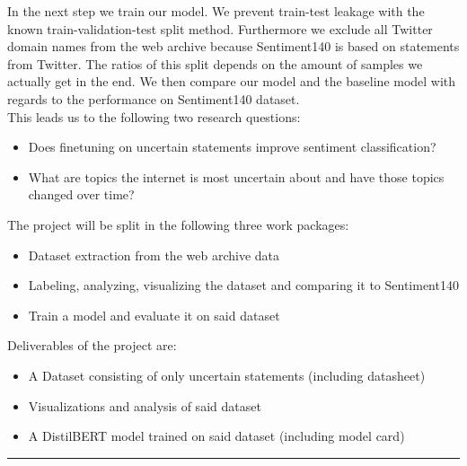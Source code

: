 \documentclass[a4paper,12pt,numbers=enddot]{scrartcl}
\begin{document}
In the next step we train our model. We prevent train-test leakage with the known train-validation-test split method. Furthermore we exclude all Twitter domain names from the web archive because Sentiment140 is based on statements from Twitter. The ratios of this split depends on the amount of samples we actually get in the end. We then compare our model and the baseline model with regards to the performance on Sentiment140 dataset.
\\

This leads us to the following two research questions:
\begin{itemize}
	\setlength\itemsep{-5pt}
	\item Does finetuning on uncertain statements improve sentiment classification?
	\item What are topics the internet is most uncertain about and have those topics changed over time?
\end{itemize}

The project will be split in the following three work packages:
\begin{itemize}
	\setlength\itemsep{-5pt}
	\item Dataset extraction from the web archive data
	\item Labeling, analyzing, visualizing the dataset and comparing it to Sentiment140
	\item Train a model and evaluate it on said dataset
\end{itemize}

Deliverables of the project are:
\begin{itemize}
	\setlength\itemsep{-5pt}
	\item A Dataset consisting of only uncertain statements (including datasheet)
	\item Visualizations and analysis of said dataset
	\item A DistilBERT model trained on said dataset (including model card)
\end{itemize}
\medskip

\hrule
\vspace{-2.5em}
\renewcommand{\refname}{}
\nocite{*}

\end{document}
